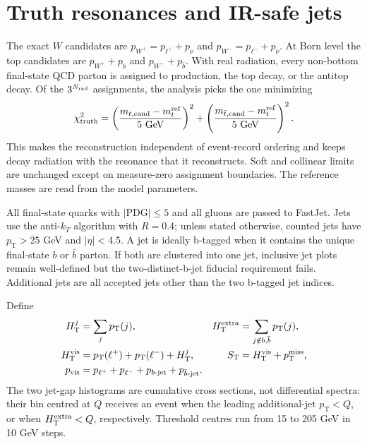 \documentclass[10pt,a4paper]{article}
\newcommand{\pt}{p_{\mathrm T}}
\newcommand{\met}{p_{\mathrm T}^{\mathrm{miss}}}
\newcommand{\lplus}{\ell^+}
\newcommand{\lminus}{\ell^-}
\newcommand{\Wp}{W^+}
\newcommand{\Wm}{W^-}
\begin{document}
\section{Truth resonances and IR-safe jets}

The exact \(W\) candidates are
\(p_{\Wp}=p_{\lplus}+p_\nu\) and
\(p_{\Wm}=p_{\lminus}+p_{\bar\nu}\).  At Born level the top candidates are
\(p_{\Wp}+p_b\) and \(p_{\Wm}+p_{\bar b}\).  With real radiation, every
non-bottom final-state QCD parton is assigned to production, the top decay, or
the antitop decay.  Of the \(3^{N_{\rm rad}}\) assignments, the analysis picks
the one minimizing
\begin{equation}
 \chi^2_{\rm truth}=
 \left(\frac{m_{t,\rm cand}-m_t^{\rm ref}}{5\ \mathrm{GeV}}\right)^2+
 \left(\frac{m_{\bar t,\rm cand}-m_t^{\rm ref}}{5\ \mathrm{GeV}}\right)^2.
\end{equation}
This makes the reconstruction independent of event-record ordering and keeps
decay radiation with the resonance that it reconstructs.  Soft and collinear
limits are unchanged except on measure-zero assignment boundaries.  The
reference masses are read from the model parameters.

All final-state quarks with \(|\mathrm{PDG}|\leq5\) and all gluons are passed
to FastJet.  Jets use the anti-\(k_T\) algorithm with \(R=0.4\); unless stated
otherwise, counted jets have \(\pt>25\) GeV and \(|\eta|<4.5\).  A jet is
ideally b-tagged when it contains the unique final-state \(b\) or \(\bar b\)
parton.  If both are clustered into one jet, inclusive jet plots remain
well-defined but the two-distinct-b-jet fiducial requirement fails.  Additional
jets are all accepted jets other than the two b-tagged jet indices.

Define
\begin{align}
 H_{\mathrm T}^{j}&=\sum_{j}\pt(j), &
 H_{\mathrm T}^{\rm extra}&=\sum_{j\notin b,\bar b}\pt(j),\\
 H_{\mathrm T}^{\rm vis}&=\pt(\lplus)+\pt(\lminus)+H_{\mathrm T}^{j}, &
 S_{\mathrm T}&=H_{\mathrm T}^{\rm vis}+\met,\\
 p_{\rm vis}&=p_{\lplus}+p_{\lminus}+p_{b\text{-jet}}+p_{\bar b\text{-jet}}.
\end{align}
The two jet-gap histograms are cumulative cross sections, not differential
spectra: their bin centred at \(Q\) receives an event when the leading
additional-jet \(\pt<Q\), or when \(H_{\mathrm T}^{\rm extra}<Q\),
respectively.  Threshold centres run from 15 to 205 GeV in 10 GeV steps.
\end{document}
